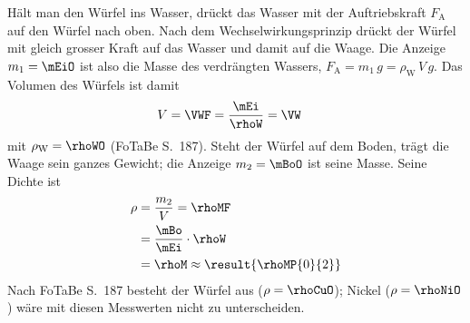 \begin{center}
\end{center}

Hält man den Würfel ins Wasser, drückt das Wasser mit der Auftriebskraft $F_\text{A}$ auf den Würfel nach oben. Nach dem Wechselwirkungsprinzip drückt der Würfel mit gleich grosser Kraft auf das Wasser und damit auf die Waage. Die Anzeige $m_1 = \mEiO$ ist also die Masse des verdrängten Wassers, $F_\text{A} = m_1\,g = \rho_\text{W}\,V\,g$. Das Volumen des Würfels ist damit
\begin{align}
 V &= \VWF = \frac{\mEi}{\rhoW} = \VW
\end{align}
mit $\rho_\text{W} = \rhoWO$ (FoTaBe S.~187). Steht der Würfel auf dem Boden, trägt die Waage sein ganzes Gewicht; die Anzeige $m_2 = \mBoO$ ist seine Masse. Seine Dichte ist
\begin{align}
 \rho &= \frac{m_2}{V} = \rhoMF \\
   &= \frac{\mBo}{\mEi}\cdot\rhoW \\
   &= \rhoM \approx \result{\rhoMP{0}{2}}
\end{align}
Nach FoTaBe S.~187 besteht der Würfel aus  ($\rho = \rhoCuO$); Nickel ($\rho = \rhoNiO$) wäre mit diesen Messwerten nicht zu unterscheiden.
